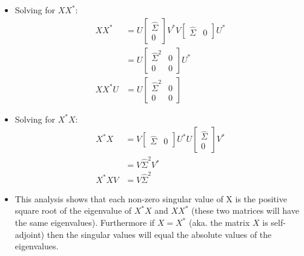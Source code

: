 \documentclass[11.5pt,a4paper]{article}
\begin{document}
\begin{itemize}
\begin{itemize}
        \item Solving for $XX^*$:
        \begin{align*}
            XX^* &= U \begin{bmatrix} \hat{\Sigma} \\
                                    0 
                \end{bmatrix} V^*V \begin{bmatrix}
                    \hat{\Sigma} & 0
                \end{bmatrix} U^* \\
                &= U \begin{bmatrix}
                    \hat{\Sigma}^2 & 0 \\
                    0 & 0
                \end{bmatrix} U^* \\
            XX^*U &= U \begin{bmatrix}
                    \hat{\Sigma}^2 & 0 \\
                    0 & 0
                \end{bmatrix}
        \end{align*}
        \item Solving for $X^*X$:
        \begin{align*}
            X^*X &= V \begin{bmatrix} \hat{\Sigma} & 0 \end{bmatrix}U^*U \begin{bmatrix} \hat{\Sigma} \\ 0 \end{bmatrix}V^* \\
                &= V\hat{\Sigma}^2V^*\\
            X^*XV &= V\hat{\Sigma}^2 
        \end{align*}
        \item This analysis shows that each non-zero singular value of X is the positive square root of the eigenvalue of $X^*X$ and $XX^*$ (these two matrices will have the same eigenvalues). Furthermore if $X = X^*$ (aka. the matrix $X$ is self-adjoint) then the singular values will equal the absolute values of the eigenvalues.


\end{itemize}
\end{itemize}
\end{document}
